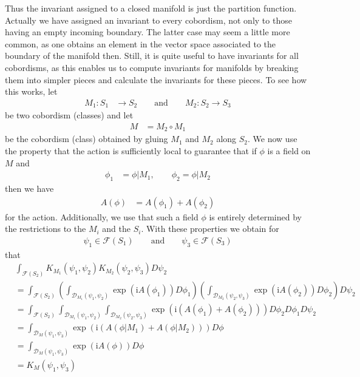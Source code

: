 Thus the invariant assigned to a closed manifold is just the partition function.
\\
Actually we have assigned an invariant to every cobordism, not only to those having an empty incoming boundary. The latter case may seem a little more common, as one obtains an element in the vector space associated to the boundary of the manifold then. Still, it is quite useful to have invariants for all cobordisms, as this enables us to compute invariants for manifolds by breaking them into simpler pieces and calculate the invariants for these pieces. To see how this works, let
\begin{align*}
  M_{1}
  \colon
  S_{1}
  &\to
  S_{2}
  \qquad
  \text{and}
  \qquad
  M_{2}
  \colon
  S_{2}
  \to
  S_{3}
\end{align*}
be two cobordism (classes) and let
\begin{align*}
  M
  &=
  M_{2}
  \circ
  M_{1}
\end{align*}
be the cobordism (class) obtained by gluing $M_{1}$ and $M_{2}$ along $S_{2}$. We now use the property that the action is {\glqq}sufficiently local{\grqq} to guarantee that if $\phi$ is a field on $M$ and
\begin{align*}
  \phi_{1}
  &=
  \phi
  \vert
  M_{1}
  ,\qquad
  \phi_{2}
  =
  \phi
  \vert
  M_{2}
\end{align*}
then we have
\begin{align*}
  A(\phi)
  &=
  A(\phi_{1})
  +
  A(\phi_{2})
\end{align*}
for the action. Additionally, we use that such a field $\phi$ is entirely determined by the restrictions to the $M_{i}$ and the $S_{i}$. With these properties we obtain for
\begin{align*}
  \psi_{1}
  \in
  \mathcal{F}(S_{1})
  \qquad
  \text{and}
  \qquad
  \psi_{3}
  \in
  \mathcal{F}(S_{3})
\end{align*}
that
\begin{align*}
  &
  \int_{\mathcal{F}(S_{2})}
  K_{M_{1}}(\psi_{1},\psi_{2})
  K_{M_{2}}(\psi_{2},\psi_{3})
  D\psi_{2}
  \\
  &=
  \int_{\mathcal{F}(S_{2})}
  \left(
    \int_{\mathcal{D}_{M_{1}}(\psi_{1},\psi_{2})}
    \exp(\mathrm{i}A(\phi_{1}))
    D\phi_{1}
  \right)
  \left(
    \int_{\mathcal{D}_{M_{2}}(\psi_{2},\psi_{3})}
    \exp(\mathrm{i}A(\phi_{2}))
    D\phi_{2}
  \right)
  D\psi_{2}
  \\
  &=
  \int_{\mathcal{F}(S_{2})}
  \int_{\mathcal{D}_{M_{1}}(\psi_{1},\psi_{2})}
  \int_{\mathcal{D}_{M_{2}}(\psi_{2},\psi_{3})}
  \exp
  \left(
    \mathrm{i}
    \left(
      A(\phi_{1})
      +
      A(\phi_{2})
    \right)
  \right)
  D\phi_{2}
  D\phi_{1}
  D\psi_{2}
  \\
  &=
  \int_{\mathcal{D}_{M}(\psi_{1},\psi_{3})}
  \exp
  \left(
    \mathrm{i}
    \left(
      A(\phi \vert M_{1})
      +
      A(\phi \vert M_{2})
    \right)
  \right)
  D\phi
  \\
  &=
  \int_{\mathcal{D}_{M}(\psi_{1},\psi_{3})}
  \exp(\mathrm{i}A(\phi))
  D\phi
  \\
  &=
  K_{M}(\psi_{1},\psi_{3})
\end{align*}
